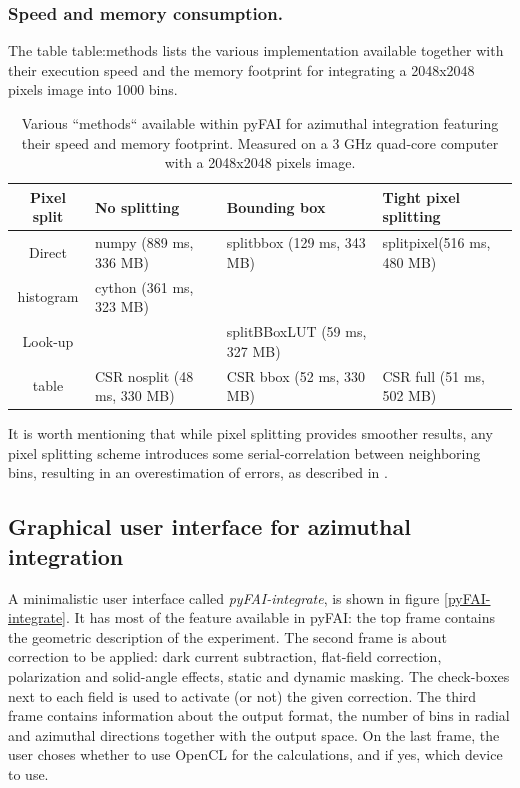 \documentclass[preprint]{iucr}
\begin{document}
\subsubsection{Speed and memory consumption.}

The table {table:methods}  lists the various implementation available together
with their execution speed and the memory footprint for integrating a 2048x2048
pixels image into 1000 bins.

\begin{table}
\caption{Various ``methods`` available within pyFAI for azimuthal integration
featuring their speed and memory footprint. Measured on a 3 GHz quad-core
computer with a 2048x2048 pixels image.}
\begin{tabular}[pos]{|c|l|l|l|}
\hline
Pixel split& No splitting & Bounding box & Tight pixel splitting \\
\hline
Direct    & numpy (889 ms, 336 MB) & splitbbox (129 ms, 343 MB) &
splitpixel(516 ms, 480 MB)\\
histogram & cython (361 ms, 323 MB) &                       &                \\
\hline
Look-up   &       & splitBBoxLUT (59 ms, 327 MB) &    \\
table     & CSR nosplit (48 ms, 330 MB)       & CSR bbox (52 ms, 330
MB) & CSR full (51 ms, 502 MB)\\
\hline
\end{tabular}
\label{table:methods}
\end{table}

It is worth mentioning that while pixel splitting provides smoother results, any
pixel splitting scheme introduces some serial-correlation between
neighboring bins, resulting in an overestimation of errors, as described in \cite{billinge2014}.

\subsection{Graphical user interface for azimuthal integration}

A minimalistic user interface called \textit{pyFAI-integrate}, is
shown in figure \ref{pyFAI-integrate}.
It has most of the feature available in pyFAI:
the top frame contains the geometric description of the experiment.
The second frame is about correction to be applied: dark current subtraction,
flat-field correction, polarization and solid-angle effects, static and dynamic
masking. The check-boxes next to each field is used to activate (or not) the given
correction.
The third frame contains information about the output format, the number of bins
in radial and azimuthal directions together with the output space.
On the last frame, the user choses whether to use OpenCL for the calculations, 
and if yes, which device to use.
\end{document}
